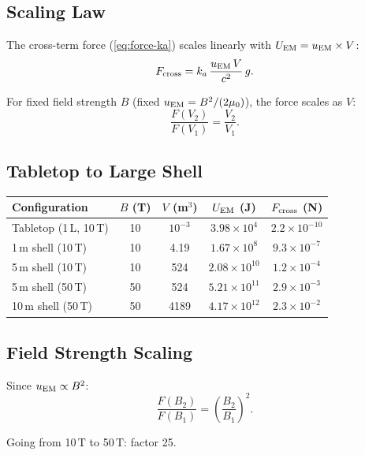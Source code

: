 \documentclass[11pt]{article}
\newcommand{\ka}{k_a}
\begin{document}
\subsection{Scaling Law}

The cross-term force (\ref{eq:force-ka}) scales linearly with
$U_{\rm EM} = u_{\rm EM} \times V$:
\begin{equation}
F_{\rm cross} = \ka\,\frac{u_{\rm EM}\,V}{c^2}\,g.
\end{equation}

For fixed field strength $B$ (fixed $u_{\rm EM} = B^2/(2\mu_0)$),
the force scales as $V$:
\begin{equation}
\frac{F(V_2)}{F(V_1)} = \frac{V_2}{V_1}.
\end{equation}

\subsection{Tabletop to Large Shell}

\begin{center}
\begin{tabular}{lcccc}
\toprule
Configuration & $B$ (T) & $V$ (m$^3$) & $U_{\rm EM}$ (J) & $F_{\rm cross}$ (N) \\
\midrule
Tabletop (1\,L, 10\,T) & 10 & $10^{-3}$ & $3.98 \times 10^4$ &
  $2.2 \times 10^{-10}$ \\
1\,m shell (10\,T) & 10 & 4.19 & $1.67 \times 10^8$ &
  $9.3 \times 10^{-7}$ \\
5\,m shell (10\,T) & 10 & 524 & $2.08 \times 10^{10}$ &
  $1.2 \times 10^{-4}$ \\
5\,m shell (50\,T) & 50 & 524 & $5.21 \times 10^{11}$ &
  $2.9 \times 10^{-3}$ \\
10\,m shell (50\,T) & 50 & 4189 & $4.17 \times 10^{12}$ &
  $2.3 \times 10^{-2}$ \\
\bottomrule
\end{tabular}
\end{center}

\subsection{Field Strength Scaling}

Since $u_{\rm EM} \propto B^2$:
\begin{equation}
\frac{F(B_2)}{F(B_1)} = \left(\frac{B_2}{B_1}\right)^2.
\end{equation}

Going from 10\,T to 50\,T: factor 25.
\end{document}
